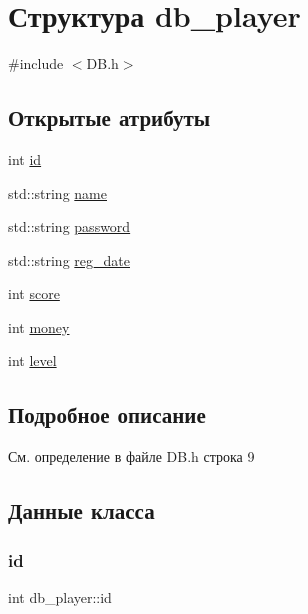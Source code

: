 \hypertarget{structdb__player}{}\section{Структура db\+\_\+player}
\label{structdb__player}


{\ttfamily \#include $<$D\+B.\+h$>$}

\subsection*{Открытые атрибуты}
\begin{DoxyCompactItemize}
\item 
int \mbox{\hyperlink{structdb__player_adae59dcd7ab22b0e66cb829f1dc5b383}{id}}
\item 
std\+::string \mbox{\hyperlink{structdb__player_a182fb42d16b91d5dccc9c640bc649521}{name}}
\item 
std\+::string \mbox{\hyperlink{structdb__player_a44fb2105fb4d116447eee76a5494821d}{password}}
\item 
std\+::string \mbox{\hyperlink{structdb__player_abef0de717f781b401effd7d3c35550c2}{reg\+\_\+date}}
\item 
int \mbox{\hyperlink{structdb__player_a49a7074936df50c10ce3573663e902bc}{score}}
\item 
int \mbox{\hyperlink{structdb__player_a11f7c74a3d7b7f6c91f5ac6823c848af}{money}}
\item 
int \mbox{\hyperlink{structdb__player_a87ec3fa495482d1018974f2694430156}{level}}
\end{DoxyCompactItemize}


\subsection{Подробное описание}


См. определение в файле D\+B.\+h строка 9



\subsection{Данные класса}
\mbox{\label{structdb__player_adae59dcd7ab22b0e66cb829f1dc5b383}} 
\subsubsection{\texorpdfstring{id}{id}}
{\footnotesize\ttfamily int db\+\_\+player\+::id}



